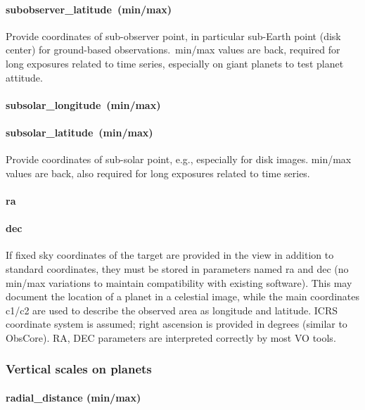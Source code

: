 \documentclass[11pt,a4paper]{ivoa}
\begin{document}
\paragraph{subobserver\_latitude (min/max)}

Provide coordinates of sub-observer point, in particular sub-Earth point (disk center) for ground-based observations. min/max values are back, required for long exposures related to time series, especially on giant planets to test planet attitude.

\paragraph{subsolar\_longitude (min/max)}

\paragraph{subsolar\_latitude (min/max)}

Provide coordinates of sub-solar point, e.g., especially for disk images. min/max values are back, also required for long exposures related to time series.

\paragraph{ra}

\paragraph{dec}

If fixed sky coordinates of the target are provided in the view in addition to standard coordinates, they must be stored in parameters named ra and dec (no min/max variations to maintain compatibility with existing software). This may document the location of a planet in a celestial image, while the main coordinates c1/c2 are used to describe the observed area as longitude and latitude. ICRS coordinate system is assumed; right ascension is provided in degrees (similar to ObsCore). RA, DEC parameters are interpreted correctly by most VO tools.

\subsubsection{Vertical scales on planets}

\paragraph{radial\_distance (min/max)}
\end{document}
